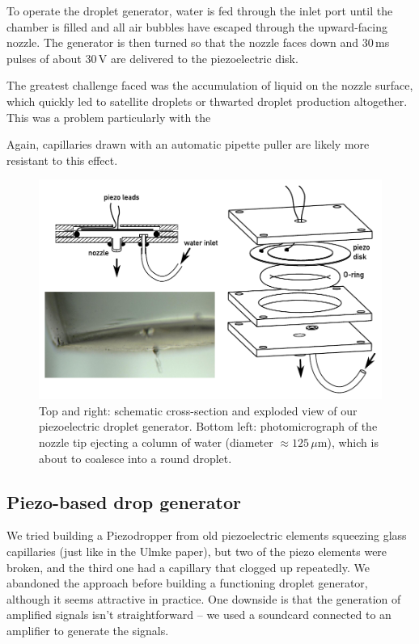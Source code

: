 \documentclass[11.5pt,oneside]{book}
\begin{document}
To operate the droplet generator, water is fed through
the inlet port until the chamber is filled and all air bubbles have escaped
through the upward-facing nozzle. The generator is then turned so that the nozzle
faces down and $30\,$ms pulses of about $30\,$V are delivered to the
piezoelectric disk.

The greatest challenge faced was the accumulation of liquid on the nozzle
surface, which quickly led to satellite droplets or thwarted droplet production
altogether. This was a problem particularly with the 

Again, capillaries drawn with an automatic pipette puller are likely
more resistant to this effect.

\begin{figure}
\centering
\includegraphics[width=\textwidth]{img/setup/flatyang_exploded.pdf}
\caption{Top and right: schematic cross-section and exploded view of our
    piezoelectric droplet generator. Bottom left: photomicrograph of the nozzle
    tip ejecting a column of water (diameter $\approx 125\,\mu$m), which is about to coalesce into a
round droplet. \label{fig:flatyang}}
\end{figure}

\subsection{Piezo-based drop generator}
We tried building a Piezodropper from old piezoelectric elements squeezing glass
capillaries (just like in the Ulmke paper), but two of the piezo elements were
broken, and the third one had a capillary that clogged up repeatedly. We
abandoned the approach before building a functioning droplet generator, although
it seems attractive in practice. One downside is that the generation of
amplified signals isn't straightforward -- we used a soundcard connected to an
amplifier to generate the signals.
\end{document}
